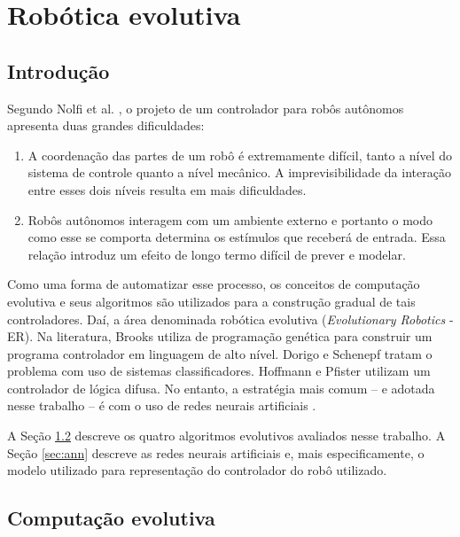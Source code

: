 \chapter{Robótica evolutiva}
\label{cha:evolutionary-robotics}

\section{Introdução}

Segundo Nolfi et al. \cite{nolfi1994howtoevolve}, o projeto de um controlador para robôs autônomos apresenta duas grandes dificuldades:

\begin{enumerate}
    \item A coordenação das partes de um robô é extremamente difícil, tanto a nível do sistema de controle quanto a nível mecânico. A imprevisibilidade da interação entre esses dois níveis resulta em mais dificuldades.
    \item Robôs autônomos interagem com um ambiente externo e portanto o modo como esse se comporta determina os estímulos que receberá de entrada. Essa relação introduz um efeito de longo termo difícil de prever e modelar.
\end{enumerate}

Como uma forma de automatizar esse processo, os conceitos de computação evolutiva e seus algoritmos são utilizados para a construção gradual de tais controladores. Daí, a área denominada robótica evolutiva (\textit{Evolutionary Robotics} - ER). Na literatura, Brooks \cite{brooks1992artificiallife} utiliza de programação genética para construir um programa controlador em linguagem de alto nível. Dorigo e Schenepf \cite{dorigo1993geneticsbased} tratam o problema com uso de sistemas classificadores. Hoffmann e Pfister \cite{hoffmann1996evolutionary} utilizam um controlador de lógica difusa. No entanto, a estratégia mais comum \cite{nelson2009fitness} -- e adotada nesse trabalho -- é com o uso de redes neurais artificiais \cite{cliff1992evolvingvisually} \cite{miglino1994selection} \cite{nolfi1994phenotypic}.

A Seção \ref{sec:evolutionary-computation} descreve os quatro algoritmos evolutivos avaliados nesse trabalho. A Seção \ref{sec:ann} descreve as redes neurais artificiais e, mais especificamente, o modelo utilizado para representação do controlador do robô utilizado.

\section{Computação evolutiva}
\label{sec:evolutionary-computation}

